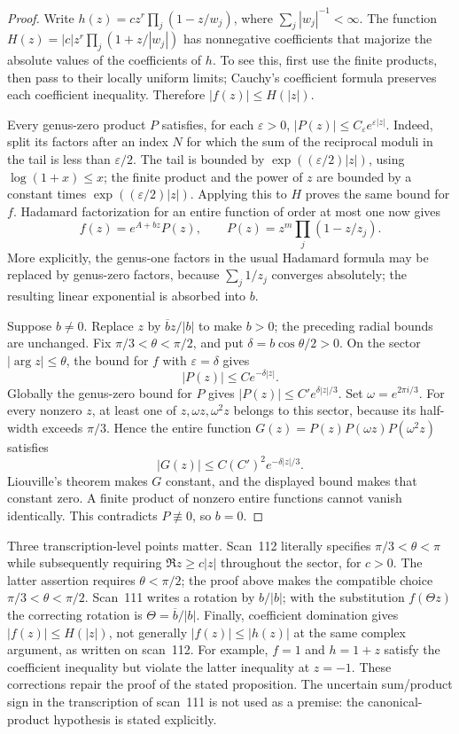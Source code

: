 \documentclass[11pt,a4paper]{article}
\theoremstyle{definition}\newtheorem{definition}[theorem]{Definition}
\theoremstyle{remark}\newtheorem{remark}[theorem]{Remark}
\begin{document}
\begin{proof}
Write $h(z)=c z^r\prod_j(1-z/w_j)$, where
$\sum_j|w_j|^{-1}<\infty$.  The function
$H(z)=|c|z^r\prod_j(1+z/|w_j|)$ has nonnegative coefficients that majorize
the absolute values of the coefficients of $h$.  To see this, first use the
finite products, then pass to their locally uniform limits; Cauchy's
coefficient formula preserves each coefficient inequality.  Therefore
$|f(z)|\leq H(|z|)$.

Every genus-zero product $P$ satisfies, for each $\varepsilon>0$,
$|P(z)|\leq C_\varepsilon e^{\varepsilon|z|}$.  Indeed, split its factors
after an index $N$ for which the sum of the reciprocal moduli in the tail is
less than $\varepsilon/2$.  The tail is bounded by
$\exp((\varepsilon/2)|z|)$, using $\log(1+x)\leq x$; the finite product
and the power of $z$ are bounded by a constant times
$\exp((\varepsilon/2)|z|)$.  Applying this to $H$ proves the same bound
for $f$.  Hadamard factorization for an entire function of order at most one
now gives
\[
 f(z)=e^{A+bz}P(z),\qquad P(z)=z^m\prod_j(1-z/z_j).
\]
More explicitly, the genus-one factors in the usual Hadamard formula may
be replaced by genus-zero factors, because $\sum_j1/z_j$ converges
absolutely; the resulting linear exponential is absorbed into $b$.

Suppose $b\ne0$.  Replace $z$ by $\overline b z/|b|$ to make $b>0$;
the preceding radial bounds are unchanged.  Fix
$\pi/3<\theta<\pi/2$, and put $\delta=b\cos\theta/2>0$.  On the sector
$|\arg z|\leq\theta$, the bound for $f$ with $\varepsilon=\delta$ gives
\[
 |P(z)|\leq C e^{-\delta|z|}.
\]
Globally the genus-zero bound for $P$ gives
$|P(z)|\leq C'e^{\delta|z|/3}$.  Set $\omega=e^{2\pi i/3}$.
For every nonzero $z$, at least one of $z,\omega z,\omega^2z$ belongs
to this sector, because its half-width exceeds $\pi/3$.  Hence the entire
function $G(z)=P(z)P(\omega z)P(\omega^2z)$ satisfies
\[
 |G(z)|\leq C(C')^2e^{-\delta|z|/3}.
\]
Liouville's theorem makes $G$ constant, and the displayed bound makes that
constant zero.  A finite product of nonzero entire functions cannot vanish
identically.  This contradicts $P\not\equiv0$, so $b=0$.
\end{proof}

Three transcription-level points matter.  Scan~112 literally specifies
$\pi/3<\theta<\pi$ while subsequently requiring
$\Re z\geq c|z|$ throughout the sector, for $c>0$.
The latter assertion requires $\theta<\pi/2$; the proof above makes the
compatible choice $\pi/3<\theta<\pi/2$.  Scan~111 writes a rotation by
$b/|b|$; with the substitution $f(\Theta z)$ the correcting rotation is
$\Theta=\overline b/|b|$.  Finally, coefficient domination gives
$|f(z)|\leq H(|z|)$, not generally $|f(z)|\leq|h(z)|$ at the same complex
argument, as written on scan~112.  For example, $f=1$ and $h=1+z$
satisfy the coefficient inequality but violate the latter inequality at
$z=-1$.  These corrections repair the proof of the stated proposition.
The uncertain sum/product sign in the transcription of scan~111 is not
used as a premise: the canonical-product hypothesis is stated explicitly.
\end{document}
